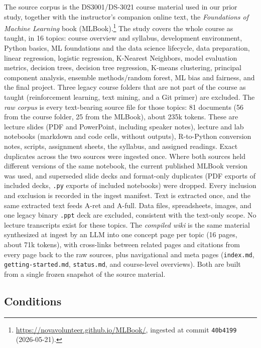 \documentclass[letterpaper]{article} %
\begin{document}
The source corpus is the DS3001/DS-3021 course material used in our prior study, together with the instructor's companion online text, the \emph{Foundations of Machine Learning} book (MLBook).\footnote{\url{https://novavolunteer.github.io/MLBook/}, ingested at commit \texttt{40b4199} (2026-05-21).} The study covers the whole course as taught, in 16 topics: course overview and syllabus, development environment, Python basics, ML foundations and the data science lifecycle, data preparation, linear regression, logistic regression, K-Nearest Neighbors, model evaluation metrics, decision trees, decision tree regression, K-means clustering, principal component analysis, ensemble methods/random forest, ML bias and fairness, and the final project. Three legacy course folders that are not part of the course as taught (reinforcement learning, text mining, and a Git primer) are excluded. The \emph{raw corpus} is every text-bearing source file for those topics: 81 documents (56 from the course folder, 25 from the MLBook), about 235k tokens. These are lecture slides (PDF and PowerPoint, including speaker notes), lecture and lab notebooks (markdown and code cells, without outputs), R-to-Python conversion notes, scripts, assignment sheets, the syllabus, and assigned readings. Exact duplicates across the two sources were ingested once. Where both sources held different versions of the same notebook, the current published MLBook version was used, and superseded slide decks and format-only duplicates (PDF exports of included decks, \texttt{.py} exports of included notebooks) were dropped. Every inclusion and exclusion is recorded in the ingest manifest. Text is extracted once, and the same extracted text feeds A-ret and A-full. Data files, spreadsheets, images, and one legacy binary \texttt{.ppt} deck are excluded, consistent with the text-only scope. No lecture transcripts exist for these topics. The \emph{compiled wiki} is the same material synthesized at ingest by an LLM into one concept page per topic (16 pages, about 71k tokens), with cross-links between related pages and citations from every page back to the raw sources, plus navigational and meta pages (\texttt{index.md}, \texttt{getting-started.md}, \texttt{status.md}, and course-level overviews). Both are built from a single frozen snapshot of the source material.

\subsection{Conditions}
\end{document}
